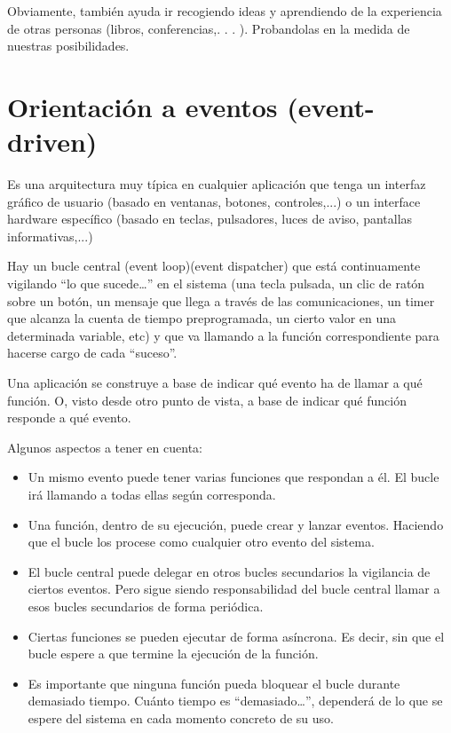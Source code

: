 \documentclass[spanish,12pt,a4paper,final,oneside]{book}
\begin{document}
Obviamente, también ayuda ir recogiendo ideas y aprendiendo de la experiencia de otras personas (libros, conferencias,. . . ). Probandolas en la medida de nuestras posibilidades.

\section{Orientación a eventos (event-driven)}\label{eventos}
Es una arquitectura muy típica en cualquier aplicación que tenga un interfaz gráfico de usuario (basado en ventanas, botones, controles,...) o un interface hardware específico (basado en teclas, pulsadores, luces de aviso, pantallas informativas,...)

Hay un bucle central (event loop)(event dispatcher) que está continuamente vigilando ``lo que sucede\ldots'' en el sistema (una tecla pulsada, un clic de ratón sobre un botón, un mensaje que llega a través de las comunicaciones, un timer que alcanza la cuenta de tiempo preprogramada, un cierto valor en una determinada variable, etc) y que va llamando a la función correspondiente para hacerse cargo de cada ``suceso''.

Una aplicación se construye a base de indicar qué evento ha de llamar a qué función. O, visto desde otro punto de vista, a base de indicar qué función responde a qué evento.

Algunos aspectos a tener en cuenta:
\begin{itemize}
\item Un mismo evento puede tener varias funciones que respondan a él. El bucle irá llamando a todas ellas según corresponda.
\item Una función, dentro de su ejecución, puede crear y lanzar eventos. Haciendo que el bucle los procese como cualquier otro evento del sistema.
\item El bucle central puede delegar en otros bucles secundarios la vigilancia de ciertos eventos. Pero sigue siendo responsabilidad del bucle central llamar a esos bucles secundarios de forma periódica.
\item Ciertas funciones se pueden ejecutar de forma asíncrona. Es decir, sin que el bucle espere a que termine la ejecución de la función.
\item Es importante que ninguna función pueda bloquear el bucle durante demasiado tiempo. Cuánto tiempo es ``demasiado\ldots'', dependerá de lo que se espere del sistema en cada momento concreto de su uso.
\end{itemize}
\end{document}
